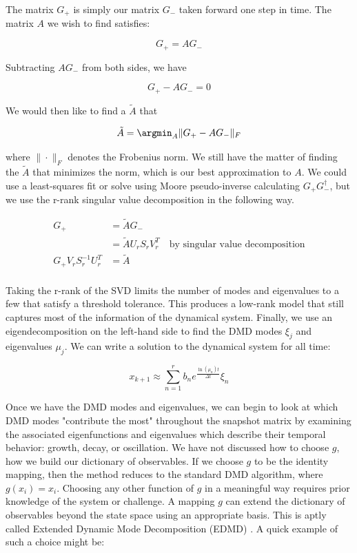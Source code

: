 \noindent The matrix $G_+$ is simply our matrix $G_-$ taken forward one step in time. 
The matrix ${A}$ we wish to find satisfies:

$$
G_+ = AG_-
$$

\noindent Subtracting $AG_-$ from both sides, we have

$$
G_+ - {A}G_- = 0
$$

\noindent We would then like to find a ${\tilde A}$ that 

$$
{\tilde A} = {\argmin_{A}} \|G_+ - {A}G_- \|_{F}
$$

\noindent where $\| \cdot \|_{F}$ denotes the Frobenius norm. We still have the matter of finding the 
${\tilde A}$ that minimizes the norm, which is our best approximation to $A$. We could
use a least-squares fit or solve using Moore pseudo-inverse calculating $G_+G^{\dagger}_-$, but we use 
the r-rank singular value decomposition in the following way.

\begin{align*}
    G_+ &= {\tilde A}G_- \\
    &= {\tilde A}U_rS_rV^{T}_r \quad \text{by singular value decomposition} \\ 
G_+ V_r S^{-1}_r U^{T}_r &= {\tilde A} \\
\end{align*}

Taking the r-rank of the SVD limits the number of modes and
 eigenvalues to a few that satisfy a threshold tolerance. This produces a low-rank model
 that still captures most of the information of the dynamical system. Finally, we use an eigendecomposition on the left-hand side to find the 
DMD modes $\xi_j$ and eigenvalues $\mu_j$. We can write a solution to the dynamical system for all time:

$$
x_{k+1} \approx \sum^{r}_{n=1} b_n e^{\frac{\ln(\mu_n)t}{\Delta t}} \xi_n
$$


Once we have the DMD modes and eigenvalues, we can begin to look at which DMD modes
"contribute the most" throughout the snapshot matrix by examining the associated eigenfunctions and eigenvalues which describe
their temporal behavior: growth, decay, or oscillation. We have not
 discussed how to choose $g$, how we build our dictionary of observables. If we choose $g$ to 
be the identity mapping, then the method reduces to the standard DMD algorithm, where $g(x_i) = x_i$.
Choosing any other function of $g$ in a meaningful way requires prior knowledge of the system or challenge. %
A mapping $g$ can extend the dictionary of observables beyond the state space using an appropriate 
basis. This is aptly called Extended Dynamic Mode Decomposition (EDMD) \cite{doi:10.1137/1.9781611974508}. A quick example of such
a choice might be:

